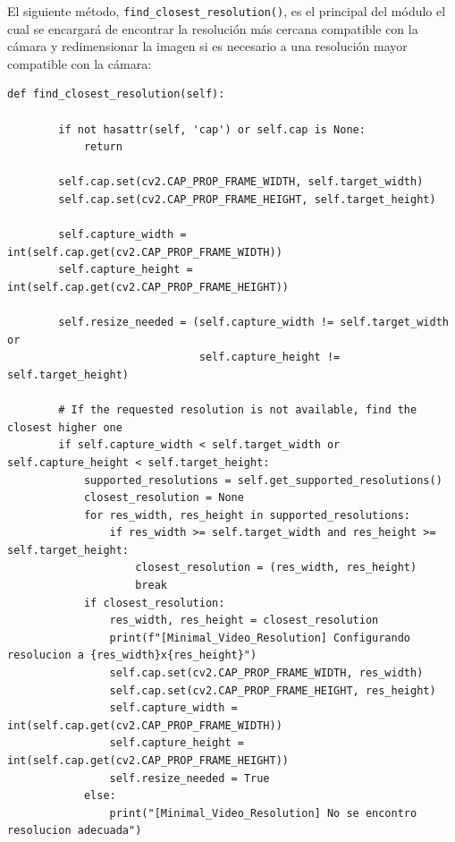 El siguiente método, \texttt{find\_closest\_resolution()}, es el principal del módulo el cual se encargará de encontrar la resolución más cercana compatible con la cámara y redimensionar la imagen si es necesario a una resolución mayor compatible con la cámara:
\begin{lstlisting}[style=pythonstyle, caption={Método \texttt{find\_closest\_resolution()} de \textit{Minimal\_Video\_Resolution}.}, label={lst:find_closest_resolution_minimal_video_resolution}]
def find_closest_resolution(self):
    
        if not hasattr(self, 'cap') or self.cap is None:
            return

        self.cap.set(cv2.CAP_PROP_FRAME_WIDTH, self.target_width)
        self.cap.set(cv2.CAP_PROP_FRAME_HEIGHT, self.target_height)

        self.capture_width = int(self.cap.get(cv2.CAP_PROP_FRAME_WIDTH))
        self.capture_height = int(self.cap.get(cv2.CAP_PROP_FRAME_HEIGHT))

        self.resize_needed = (self.capture_width != self.target_width or 
                              self.capture_height != self.target_height)

        # If the requested resolution is not available, find the closest higher one
        if self.capture_width < self.target_width or self.capture_height < self.target_height:
            supported_resolutions = self.get_supported_resolutions()
            closest_resolution = None
            for res_width, res_height in supported_resolutions:
                if res_width >= self.target_width and res_height >= self.target_height:
                    closest_resolution = (res_width, res_height)
                    break
            if closest_resolution:
                res_width, res_height = closest_resolution
                print(f"[Minimal_Video_Resolution] Configurando resolucion a {res_width}x{res_height}")
                self.cap.set(cv2.CAP_PROP_FRAME_WIDTH, res_width)
                self.cap.set(cv2.CAP_PROP_FRAME_HEIGHT, res_height)
                self.capture_width = int(self.cap.get(cv2.CAP_PROP_FRAME_WIDTH))
                self.capture_height = int(self.cap.get(cv2.CAP_PROP_FRAME_HEIGHT))
                self.resize_needed = True
            else:
                print("[Minimal_Video_Resolution] No se encontro resolucion adecuada")
\end{lstlisting}
\vspace{\baselineskip}

